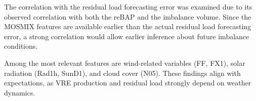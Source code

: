 \documentclass[class=scrbook, crop=false]{standalone}
\begin{document}
The correlation with the residual load forecasting error was examined due to its observed correlation with both the reBAP and the imbalance volume. Since the MOSMIX features are available earlier than the actual residual load forecasting error, a strong correlation would allow earlier inference about future imbalance conditions.

Among the most relevant features are wind-related variables (FF, FX1), solar radiation (Rad1h, SunD1), and cloud cover (N05). These findings align with expectations, as VRE production and residual load strongly depend on weather dynamics.




    
    
\end{document}

